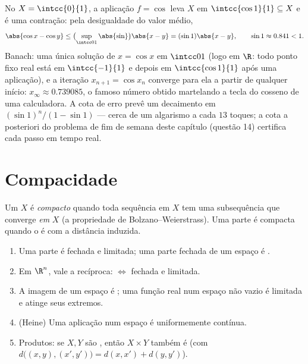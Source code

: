 \begin{example}[Um ponto fixo numérico: $x = \cos x$]\label{ex:b2:metric:cosfix}
No  $X = \intcc{0}{1}$, a aplicação $f = \cos$ leva $X$
em $\intcc{\cos 1}{1} \subseteq X$ e é uma contração: pela
desigualdade do valor médio,
\[
\abs{\cos x - \cos y} \leq \bigl(\sup_{\intcc01}\abs{\sin}\bigr)
\abs{x - y} = (\sin 1)\abs{x - y},
\qquad \sin 1 \approx 0.841 < 1 .
\]
Banach: uma única solução de $x = \cos x$ em $\intcc01$ (logo em
$\R$: todo ponto fixo real está em $\intcc{-1}{1}$ e depois em
$\intcc{\cos 1}{1}$ após uma aplicação), e a iteração
$x_{n+1} = \cos x_n$ converge para ela a partir de qualquer início: $x_\infty
\approx 0.739085$, o famoso número obtido martelando a
tecla do cosseno de uma calculadora. A cota de erro prevê
um decaimento em $(\sin1)^n/(1 - \sin1)$ --- cerca de um algarismo a cada $13$
toques; a cota a posteriori do problema de fim de semana deste
capítulo (questão 14) certifica cada passo em tempo real.
\end{example}

\section{Compacidade}

\begin{definition}\label{def:b2:metric:compact}
Um  $X$ é \emph{compacto}
quando toda sequência em $X$ tem uma subsequência que converge \emph{em}
$X$ (a propriedade de Bolzano--Weierstrass). Uma parte é compacta quando o
é com a distância induzida.
\end{definition}

\begin{theorem}\label{thm:b2:metric:compactprops}
\begin{enumerate}
  \item Uma parte  é fechada e limitada; uma parte fechada de um
        espaço  é .
  \item Em $\R^n$, vale a recíproca:  $\iff$ fechada e
        limitada.
  \item A imagem  de um espaço  é ; uma função
        real  num espaço  não vazio é
        limitada e atinge seus extremos.
  \item (Heine) Uma aplicação  num espaço  é uniformemente
        contínua.
  \item Produtos: se $X, Y$ são , então $X \times Y$ também é (com
        $d\bigl((x,y),(x',y')\bigr) = d(x,x') + d(y,y')$).
\end{enumerate}
\end{theorem}

